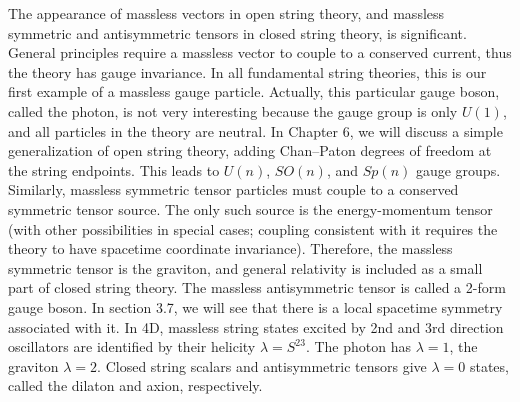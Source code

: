 The appearance of massless vectors in open string theory, and massless symmetric and antisymmetric tensors in closed string theory, is significant. General principles require a massless vector to couple to a conserved current, thus the theory has gauge invariance. 
In all fundamental string theories, this is our first example of a massless gauge particle. Actually, this particular gauge boson, called the photon, is not very interesting because the gauge group is only $U(1)$, and all particles in the theory are neutral. In Chapter 6, we will discuss a simple generalization of open string theory, adding Chan–Paton degrees of freedom at the string endpoints. This leads to $U(n)$, $SO(n)$, and $Sp(n)$ gauge groups. Similarly, massless symmetric tensor particles must couple to a conserved symmetric tensor source. The only such source is the energy-momentum tensor (with other possibilities in special cases; coupling consistent with it requires the theory to have spacetime coordinate invariance). Therefore, the massless symmetric tensor is the graviton, and general relativity is included as a small part of closed string theory. The massless antisymmetric tensor is called a 2-form gauge boson. In section 3.7, we will see that there is a local spacetime symmetry associated with it. 
In 4D, massless string states excited by 2nd and 3rd direction oscillators are identified by their helicity $\lambda=S^{23}$. The photon has $\lambda=1$, the graviton $\lambda=2$. Closed string scalars and antisymmetric tensors give $\lambda=0$ states, called the dilaton and axion, respectively. 

